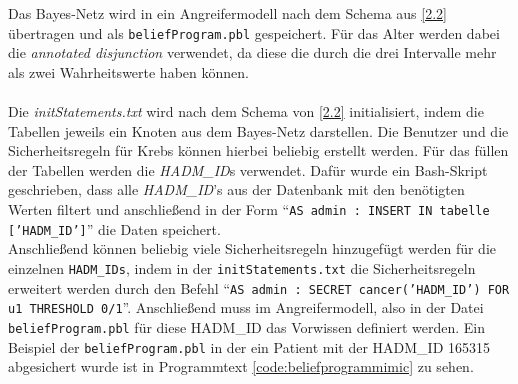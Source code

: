 \documentclass[german,version-2020-11]{uzl-thesis}
\begin{document}
\begin{figure}[ht]
\end{figure}Das Bayes-Netz wird in ein Angreifermodell nach dem Schema aus \ref{2.2} übertragen und als \texttt{beliefProgram.pbl} gespeichert. Für das Alter werden dabei die \textit{annotated disjunction} verwendet, da diese die durch die drei Intervalle mehr als zwei Wahrheitswerte haben können. \\ \\
Die \textit{initStatements.txt} wird nach dem Schema von \ref{2.2} initialisiert, indem die Tabellen jeweils ein Knoten aus dem Bayes-Netz darstellen. Die Benutzer und die Sicherheitsregeln für Krebs können hierbei beliebig erstellt werden. Für das füllen der Tabellen werden die \textit{HADM\_ID}s verwendet. Dafür wurde ein Bash-Skript geschrieben, dass alle \textit{HADM\_ID}'s  aus der Datenbank mit den benötigten Werten filtert und anschließend in der Form \enquote{\texttt{AS admin : INSERT IN tabelle ['HADM\_ID']}} die Daten speichert. \\ 
Anschließend können beliebig viele Sicherheitsregeln hinzugefügt werden für die einzelnen \texttt{HADM\_IDs}, indem in der \texttt{initStatements.txt} die Sicherheitsregeln erweitert werden durch den Befehl \enquote{\texttt{AS admin : SECRET cancer('HADM\_ID') FOR u1 THRESHOLD 0/1}}. Anschließend muss im Angreifermodell, also in der Datei \texttt{beliefProgram.pbl} für diese HADM\_ID das Vorwissen definiert werden. Ein Beispiel der \texttt{beliefProgram.pbl} in der ein Patient mit der HADM\_ID 165315 abgesichert wurde ist in Programmtext  \ref{code:beliefprogrammimic} zu sehen. 
\end{document}
